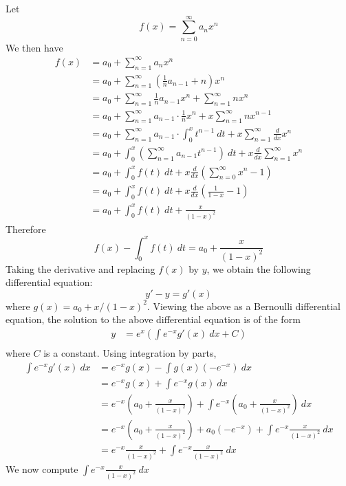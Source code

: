Let
\[
f(x) = \sum_{n = 0}^\infty a_n x^n
\]
We then have
\begin{align*}
f(x)
&= a_0 + \sum_{n = 1}^\infty a_n x^n \\
&= a_0 + \sum_{n = 1}^\infty \left( \frac{1}{n} a_{n-1} + n \right) x^n \\
&= a_0
  + \sum_{n = 1}^\infty \frac{1}{n} a_{n-1} x^n
  + \sum_{n = 1}^\infty  n x^n \\
&= a_0
  + \sum_{n = 1}^\infty a_{n-1} \cdot \frac{1}{n} x^{n}
  + x \sum_{n = 1}^\infty  n x^{n-1} \\
&= a_0
  + \sum_{n = 1}^\infty a_{n-1} \cdot \int_{0}^x t^{n-1} \ dt
  + x \sum_{n = 1}^\infty  \frac{d}{dx} x^n\\
&= a_0
  + \int_{0}^x \left( \sum_{n = 1}^\infty a_{n-1} t^{n-1} \right) \ dt
  + x \frac{d}{dx} \sum_{n = 1}^\infty  x^n\\
&= a_0
  + \int_0^x f(t) \ dt
  + x \frac{d}{dx} \left( \sum_{n = 0}^\infty  x^n - 1 \right) \\
&= a_0
  + \int_0^x f(t) \ dt
  + x \frac{d}{dx} \left( \frac{1}{1-x}  - 1 \right) \\
&= a_0
  + \int_0^x f(t) \ dt
  + \frac{x}{(1-x)^2}   
\end{align*}
Therefore
\[
f(x) - \int_0^x f(t) \ dt = a_0 + \frac{x}{(1-x)^2}
\]
Taking the derivative and replacing $f(x)$ by $y$, we obtain the following
differential equation:
\[
y' - y
= g'(x)
\]
where $g(x) = a_0 + x/(1-x)^2$.
Viewing the above as a Bernoulli differential equation, 
the solution to the above differential equation is of the form
\begin{align*}
y
&= e^x
  \left(
  \int e^{-x} g'(x) \ dx + C
  \right)
   \\
   \tag{1}
\end{align*}
where $C$ is a constant.
Using integration by parts,
\begin{align*}
  \int e^{-x} g'(x) \ dx
&= e^{-x} g(x) - \int g(x)(-e^{-x}) \ dx \\
&= e^{-x} g(x) + \int e^{-x} g(x) \ dx \\
&= e^{-x} \left( a_0 + \frac{x}{(1-x)^2} \right)
   + \int e^{-x} \left( a_0 + \frac{x}{(1-x)^2} \right) \ dx
   \\
&= e^{-x} \left( a_0 + \frac{x}{(1-x)^2} \right)
   + a_0(-e^{-x}) + \int e^{-x} \frac{x}{(1-x)^2}\ dx
   \\
&= e^{-x} \frac{x}{(1-x)^2} 
   + \int e^{-x} \frac{x}{(1-x)^2}\ dx
   \tag{2}
\end{align*}
We now compute $\int e^{-x} \frac{x}{(1-x)^2}\ dx$
